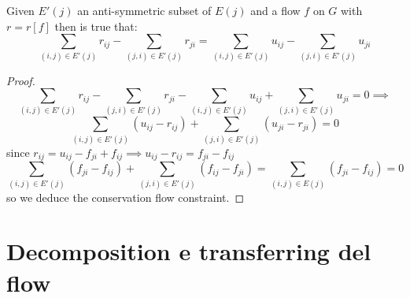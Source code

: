 \begin{lemma}

    Given $E'(j)$ an anti-symmetric subset of $E(j)$ and a flow $f$ on $G$ with $r = r[f]$ then is true that:
    \[\sum_{(i,j)\in E'(j)}r_{ij} - \sum_{(j,i)\in E'(j)}r_{ji} = \sum_{(i,j)\in E'(j)}u_{ij} - \sum_{(j,i)\in E'(j)}u_{ji} \]
\end{lemma}
\begin{proof}
    \[\sum_{(i,j)\in E'(j)}r_{ij} - \sum_{(j,i)\in E'(j)}r_{ji} -\sum_{(i,j)\in E'(j)}u_{ij} + \sum_{(j,i)\in E'(j)}u_{ji}= 0 \implies\]
    \[\sum_{(i,j)\in E'(j)}(u_{ij}-r_{ij}) + \sum_{(j,i)\in E'(j)}(u_{ji}-r_{ji}) = 0 \]
    since $r_{ij} = u_{ij} - f_{ji} + f_{ij} \implies u_{ij} -r_{ij} = f_{ji}- f_{ij}$ 
    \[\sum_{(i,j)\in E'(j)}(f_{ji}-f_{ij}) + \sum_{(j,i)\in E'(j)}(f_{ij}-f_{ji}) = \sum_{(i,j)\in E(j)}(f_{ji}-f_{ij}) = 0\]
    so we deduce the conservation flow constraint. 

\end{proof}
\section{Decomposition e transferring del flow}

